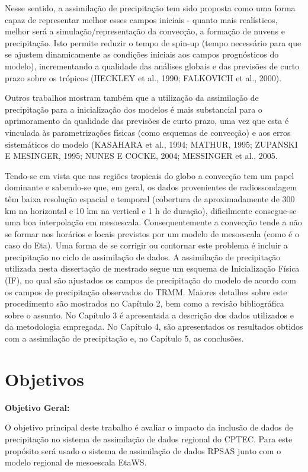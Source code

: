 Nesse sentido, a assimilação de precipitação tem sido proposta como uma forma capaz de representar melhor esses campos iniciais - quanto mais realísticos, melhor será a simulação/representação da convecção, a formação de nuvens e precipitação. Isto permite reduzir o tempo de spin-up (tempo necessário para que se ajustem dinamicamente as condições iniciais aos campos prognósticos do modelo), incrementando a qualidade das análises globais e das previsões de curto prazo sobre os trópicos (HECKLEY et al., 1990; FALKOVICH et al., 2000).

Outros trabalhos mostram também que a utilização da assimilação de precipitação para a inicialização dos modelos é mais substancial para o aprimoramento da qualidade das previsões de curto prazo, uma vez que esta é vinculada às parametrizações físicas (como esquemas de convecção) e aos erros sistemáticos do modelo (KASAHARA et al., 1994; MATHUR, 1995; ZUPANSKI E MESINGER, 1995; NUNES E COCKE, 2004; MESSINGER et al., 2005.

Tendo-se em vista que nas regiões tropicais do globo a convecção tem um papel dominante e sabendo-se que, em geral, os dados provenientes de radiossondagem têm baixa resolução espacial e temporal (cobertura de aproximadamente de 300 km na horizontal e 10 km na vertical e 1 h de duração), dificilmente consegue-se uma boa interpolação em mesoescala. Consequentemente a convecção tende a não se formar nos horários e locais previstos por um modelo de mesoescala (como é o caso do Eta). Uma forma de se corrigir ou contornar este problema é incluir a precipitação no ciclo de assimilação de dados. A assimilação de precipitação utilizada nesta dissertação de mestrado segue um esquema de Inicialização Física (IF), no qual são ajustados os campos de precipitação do modelo de acordo com os campos de precipitação observados do TRMM. Maiores detalhes sobre este procedimento são mostrados no Capítulo 2, bem como a revisão bibliográfica sobre o assunto. No Capítulo 3 é apresentada a descrição dos dados utilizados e da metodologia empregada. No Capítulo 4, são apresentados os resultados obtidos com a assimilação de precipitação e, no Capítulo 5, as conclusões.

\section{Objetivos}
\label{ss:objetivos} 

\textbf{Objetivo Geral:}

O objetivo principal deste trabalho é avaliar o impacto da inclusão de dados de precipitação no sistema de assimilação de dados regional do CPTEC. Para este propósito será usado o sistema de assimilação de dados RPSAS junto com o modelo regional de mesoescala EtaWS.

